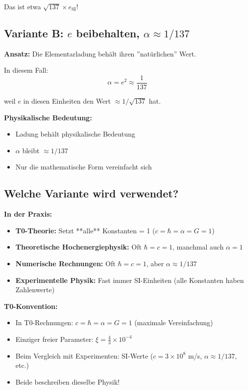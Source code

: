 	Das ist etwa $\sqrt{137} \times e_{\text{SI}}$!
	
	\subsection{Variante B: $e$ beibehalten, $\alpha \approx 1/137$}
	
	\textbf{Ansatz:} Die Elementarladung behält ihren ''natürlichen'' Wert.
	
	In diesem Fall:
	\begin{equation}
		\alpha = e^2 \approx \frac{1}{137}
	\end{equation}
	
	weil $e$ in diesen Einheiten den Wert $\approx 1/\sqrt{137}$ hat.
	
	\textbf{Physikalische Bedeutung:}
	\begin{itemize}
		\item Ladung behält physikalische Bedeutung
		\item $\alpha$ bleibt $\approx 1/137$
		\item Nur die mathematische Form vereinfacht sich
	\end{itemize}
	
	\subsection{Welche Variante wird verwendet?}
	
	\textbf{In der Praxis:}
	\begin{itemize}
		\item \textbf{T0-Theorie:} Setzt **alle** Konstanten = 1 ($c = \hbar = \alpha = G = 1$)
		\item \textbf{Theoretische Hochenergiephysik:} Oft $\hbar = c = 1$, manchmal auch $\alpha = 1$
		\item \textbf{Numerische Rechnungen:} Oft $\hbar = c = 1$, aber $\alpha \approx 1/137$
		\item \textbf{Experimentelle Physik:} Fast immer SI-Einheiten (alle Konstanten haben Zahlenwerte)
	\end{itemize}
	
	\textbf{T0-Konvention:}
	\begin{itemize}
		\item In T0-Rechnungen: $c = \hbar = \alpha = G = 1$ (maximale Vereinfachung)
		\item Einziger freier Parameter: $\xi = \frac{4}{3} \times 10^{-4}$
		\item Beim Vergleich mit Experimenten: SI-Werte ($c = 3 \times 10^8$ m/s, $\alpha \approx 1/137$, etc.)
		\item Beide beschreiben dieselbe Physik!
	\end{itemize}
	
